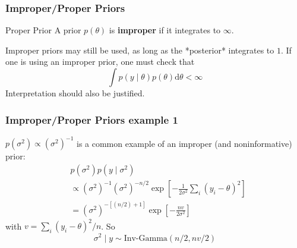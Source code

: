 \documentclass{beamer}
\begin{document}

\begin{frame}[fragile]
\frametitle{Improper/Proper Priors}

\begin{block}{Proper Prior}
A prior $p(\theta)$ is {\bf improper} if it integrates to $\infty$.
\end{block}

Improper priors may still be used, as long as the *posterior* integrates to $1$. If one is using an improper prior, one must check that 
\[
\int p(y \mid \theta) p(\theta) \text{d}\theta < \infty
\]
Interpretation should also be justified.


\end{frame}


\begin{frame}[fragile]
\frametitle{Improper/Proper Priors example 1}

$p(\sigma^2) \propto (\sigma^2)^{-1}$ is a common example of an improper (and noninformative) prior:
\begin{align*}
&p(\sigma^2)  p(y \mid \sigma^2)\\
&\propto (\sigma^2)^{-1} (\sigma^2)^{-n/2}\exp\left[-\frac{1}{2 \sigma^2} \sum_i \left(y_i - \theta \right)^2 \right] \\
&= (\sigma^2)^{-[(n/2)+1]}\exp\left[-\frac{nv}{2 \sigma^2} \right]
\end{align*}
with $v = \sum_i(y_i - \theta)^2 / n$. So
\[
\sigma^2 \mid y \sim \text{Inv-Gamma}(n/2, nv/2)
\]


\end{frame}


% 
% 
% 
% 

\end{document}
